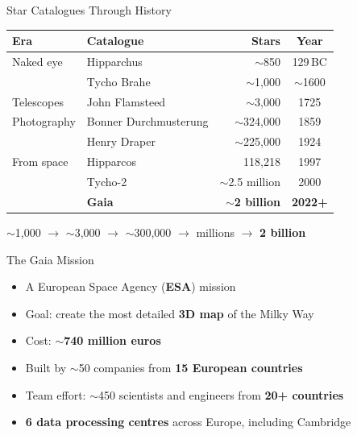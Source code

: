 \documentclass[aspectratio=169,14pt]{beamer}
\begin{document}
\begin{frame}{Star Catalogues Through History}

\begin{tabular}{llrc}
\toprule
\textbf{Era} & \textbf{Catalogue} & \textbf{Stars} & \textbf{Year} \\
\midrule
Naked eye    & Hipparchus          & $\sim$850        & 129\,BC \\
             & Tycho Brahe         & $\sim$1{,}000    & $\sim$1600 \\
Telescopes   & John Flamsteed      & $\sim$3{,}000    & 1725 \\
Photography  & Bonner Durchmusterung & $\sim$324{,}000  & 1859 \\
             & Henry Draper        & $\sim$225{,}000  & 1924 \\
\midrule
From space   & Hipparcos           & 118{,}218       & 1997 \\
             & Tycho-2             & $\sim$2.5 million & 2000 \\
             & \textbf{Gaia}       & \textbf{$\sim$2 billion} & \textbf{2022+} \\
\bottomrule
\end{tabular}

\medskip

\begin{center}
\small $\sim$1{,}000 $\rightarrow$ $\sim$3{,}000 $\rightarrow$ $\sim$300{,}000 $\rightarrow$ millions $\rightarrow$ \textbf{2 billion}
\end{center}

\end{frame}

\begin{frame}{The Gaia Mission}

\begin{itemize}\setlength{\itemsep}{4pt}
    \item A European Space Agency (\textbf{ESA}) mission
    \item Goal: create the most detailed \textbf{3D map} of the Milky Way
    \item Cost: $\sim$\textbf{740 million euros}
    \item Built by $\sim$50 companies from \textbf{15 European countries}
    \item Team effort: $\sim$450 scientists and engineers from \textbf{20+ countries}
    \item \textbf{6 data processing centres} across Europe, including Cambridge
\end{itemize}

\end{frame}
\end{document}
